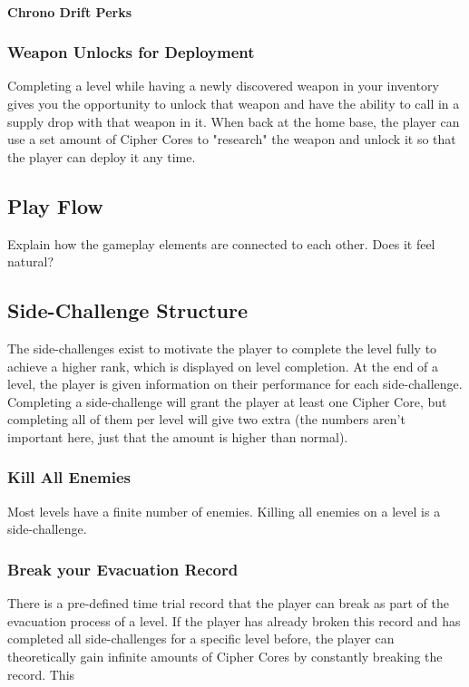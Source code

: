 \documentclass[12pt]{article}
\begin{document}
\paragraph{Chrono Drift Perks}

\subsubsection{Weapon Unlocks for Deployment}

Completing a level while having a newly discovered weapon in your inventory gives you the opportunity to unlock that weapon and have the ability to call in a supply drop with that weapon in it. When back at the home base, the player can use a set amount of Cipher Cores to "research" the weapon and unlock it so that the player can deploy it any time. 

\subsection{Play Flow}

Explain how the gameplay elements are connected to each other. Does it feel natural?

\subsection{Side-Challenge Structure}

The side-challenges exist to motivate the player to complete the level fully to achieve a higher rank, which is displayed on level completion. At the end of a level, the player is given information on their performance for each side-challenge. Completing a side-challenge will grant the player at least one Cipher Core, but completing all of them per level will give two extra (the numbers aren't important here, just that the amount is higher than normal). 

\subsubsection{Kill All Enemies}

Most levels have a finite number of enemies. Killing all enemies on a level is a side-challenge.

\subsubsection{Break your Evacuation Record}

There is a pre-defined time trial record that the player can break as part of the evacuation process of a level. If the player has already broken this record and has completed all side-challenges for a specific level before, the player can theoretically gain infinite amounts of Cipher Cores by constantly breaking the record. This 
\end{document}

